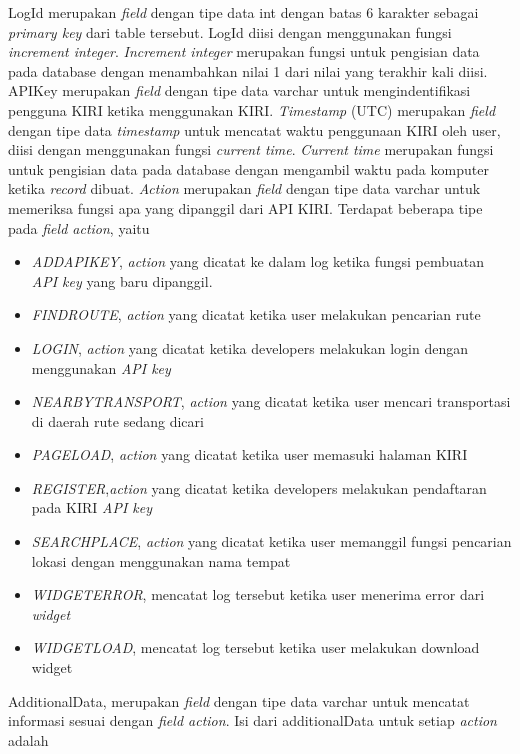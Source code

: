 LogId merupakan \textsl{field} dengan tipe data int dengan batas 6 karakter sebagai \textsl{primary key} dari table tersebut. LogId diisi dengan menggunakan fungsi \textsl{increment integer}. \textsl{Increment integer} merupakan fungsi untuk pengisian data pada database dengan menambahkan nilai 1 dari nilai yang terakhir kali diisi.
APIKey merupakan \textsl{field} dengan tipe data varchar untuk mengindentifikasi pengguna KIRI ketika menggunakan KIRI.
\textsl{Timestamp} (UTC) merupakan \textsl{field} dengan tipe data \textsl{timestamp} untuk mencatat waktu penggunaan KIRI oleh user, diisi dengan menggunakan fungsi \textsl{current time}. \textsl{Current time} merupakan fungsi untuk pengisian data pada database dengan mengambil waktu pada komputer ketika \textsl{record} dibuat.
\textsl{Action} merupakan \textsl{field} dengan tipe data varchar untuk memeriksa fungsi apa yang dipanggil dari API KIRI. Terdapat beberapa tipe pada \textsl{field action}, yaitu
\begin{itemize}
	\item \textsl{ADDAPIKEY}, \textsl{action} yang dicatat ke dalam log ketika fungsi pembuatan \textsl{API key} yang baru dipanggil.
	\item \textsl{FINDROUTE}, \textsl{action} yang dicatat ketika user melakukan pencarian rute
	\item \textsl{LOGIN}, \textsl{action} yang dicatat ketika developers melakukan login dengan menggunakan \textsl{API key}
	\item \textsl{NEARBYTRANSPORT}, \textsl{action} yang dicatat ketika user mencari transportasi di daerah rute sedang dicari
	\item \textsl{PAGELOAD}, \textsl{action} yang dicatat ketika user memasuki halaman KIRI
 	\item \textsl{REGISTER},\textsl{action} yang dicatat ketika developers melakukan pendaftaran pada KIRI \textsl{API key}
	\item \textsl{SEARCHPLACE}, \textsl{action} yang dicatat ketika user memanggil fungsi pencarian lokasi dengan menggunakan nama tempat
	\item \textsl{WIDGETERROR}, mencatat log tersebut ketika user menerima error dari \textit{widget}
	\item \textsl{WIDGETLOAD}, mencatat log tersebut ketika user melakukan download widget
\end{itemize}
AdditionalData, merupakan \textsl{field} dengan tipe data varchar untuk mencatat informasi sesuai dengan \textsl{field action}. Isi dari additionalData untuk setiap \textsl{action} adalah
